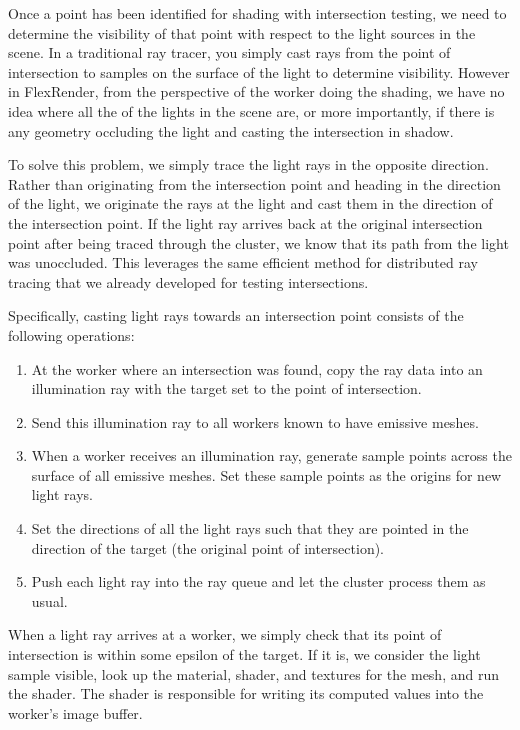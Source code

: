 \documentclass[12pt]{ucthesis}
\begin{document}
Once a point has been identified for shading with intersection testing, we
need to determine the visibility of that point with respect to the light sources
in the scene. In a traditional ray tracer, you simply cast rays from the point
of intersection to samples on the surface of the light to determine visibility.
However in FlexRender, from the perspective of the worker doing the shading,
we have no idea where all the of the lights in the scene are, or more importantly,
if there is any geometry occluding the light and casting the intersection in
shadow.

To solve this problem, we simply trace the light rays in the opposite direction.
Rather than originating from the intersection point and heading in the
direction of the light, we originate the rays at the light and cast them in the
direction of the intersection point. If the light ray arrives back at the
original intersection point after being traced through the cluster, we know that
its path from the light was unoccluded. This leverages the same efficient method
for distributed ray tracing that we already developed for testing intersections.

Specifically, casting light rays towards an intersection point consists of the
following operations:

\begin{enumerate}
    \item At the worker where an intersection was found, copy the ray data into
        an illumination ray with the target set to the point of intersection.
    \item Send this illumination ray to all workers known to have emissive meshes.
    \item When a worker receives an illumination ray, generate sample points
        across the surface of all emissive meshes. Set these sample points as
        the origins for new light rays.
    \item Set the directions of all the light rays such that they are pointed
        in the direction of the target (the original point of intersection).
    \item Push each light ray into the ray queue and let the cluster process
        them as usual.
\end{enumerate}

When a light ray arrives at a worker, we simply check that its point of
intersection is within some epsilon of the target. If it is, we consider the
light sample visible, look up the material, shader, and textures for the mesh,
and run the shader. The shader is responsible for writing its computed values
into the worker's image buffer.
\end{document}
